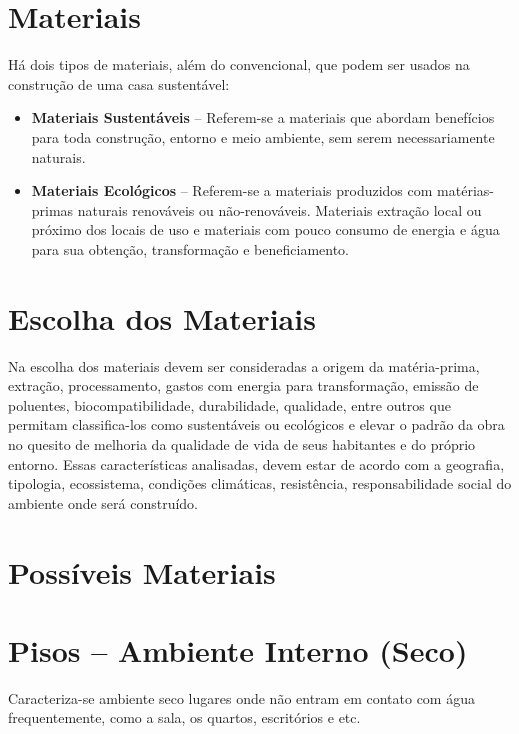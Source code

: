 \section{Materiais}

	Há dois tipos de materiais, além do convencional, que podem ser usados na construção de uma casa sustentável:
	
\begin{itemize}

	\item \textbf{Materiais Sustentáveis} – Referem-se a materiais que abordam benefícios para toda construção, entorno e meio ambiente, sem serem necessariamente naturais. 

	\item \textbf{Materiais Ecológicos} – Referem-se a materiais produzidos com matérias-primas naturais renováveis ou não-renováveis. Materiais extração local ou próximo dos locais de uso e materiais com pouco consumo de energia e água para sua obtenção, transformação e beneficiamento.

\end{itemize}

\section{Escolha dos Materiais}

	Na escolha dos materiais devem ser consideradas a origem da matéria-prima, extração, processamento, gastos com energia para transformação, emissão de poluentes, biocompatibilidade, durabilidade, qualidade, entre outros que permitam classifica-los como sustentáveis ou ecológicos e elevar o padrão da obra no quesito de melhoria da qualidade de vida de seus habitantes e do próprio entorno. Essas características analisadas, devem estar de acordo com a geografia, tipologia, ecossistema, condições climáticas, resistência, responsabilidade social do ambiente onde será construído.

\section{Possíveis Materiais}

\section{Pisos – Ambiente Interno (Seco)}

	Caracteriza-se ambiente seco lugares onde não entram em contato com água frequentemente, como a sala, os quartos, escritórios e etc.\\


